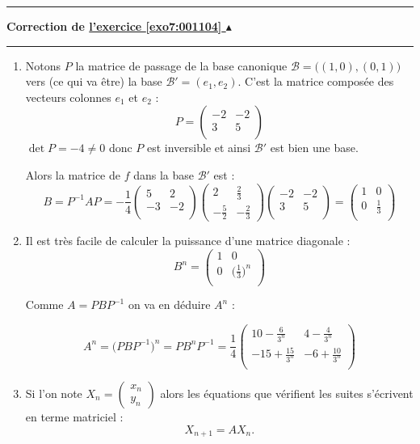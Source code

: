 \documentclass[11pt,a4paper]{article}
\newcounter{exo}
\newcommand{\correction}[1]{\hypertarget{cor7:#1}{}\label{cor7:#1}{\bf Correction de \hyperlink{exo7:#1}{l'exercice \ref{exo7:#1} $\blacktriangle$}}\vspace{1mm}\hrule\vspace{1mm}}
\newcommand{\fincorrection}{\vspace{1mm}\hrule\vspace*{7mm}}
\begin{document}
\fincorrection
\correction{001104}
\begin{enumerate}
  \item Notons $P$ la matrice de passage de la base canonique 
$\mathcal{B}=\big((1,0),(0,1)\big)$ vers (ce qui va être) la base
$\mathcal{B}' = (e_1, e_2)$. C'est la matrice composée des vecteurs colonnes
$e_1$ et $e_2$ :
$$P = \begin{pmatrix} -2 & -2 \\ 3 & 5 \\  \end{pmatrix}$$
$\det P=-4 \neq 0$ donc $P$ est inversible et ainsi $\mathcal{B}'$ est bien une base.

Alors la matrice de $f$ dans la base $\mathcal{B}'$ est :
$$B= P^{-1}AP = -\frac14\begin{pmatrix} 5 & 2 \\ -3 & -2 \\  \end{pmatrix} \begin{pmatrix} 2&\frac 23\\
-\frac 52&-\frac 23 \end{pmatrix}\begin{pmatrix} -2 & -2 \\ 3 & 5 \\  \end{pmatrix}=
\begin{pmatrix} 1 & 0 \\ 0 & \frac13 \\  \end{pmatrix}$$

  \item Il est très facile de calculer la puissance d'une matrice diagonale :
$$B^n=\begin{pmatrix} 1 & 0 \\ 0 & \big(\frac13\big)^n \\  \end{pmatrix}$$

Comme $A=PBP^{-1}$ on va en déduire $A^n$ : 

$$A^n = \big( PBP^{-1} \big)^n = P B^n P^{-1} = 
\frac14\begin{pmatrix} 
10- \frac{6} {3^n} & 4- \frac{4} {3^n}\\
-15 + \frac{15} {3^n}& -6 + \frac{10} {3^n}\\                    
       \end{pmatrix}$$

  \item Si l'on note $X_n = \begin{pmatrix}x_n \\ y_n \end{pmatrix}$
alors les équations que vérifient les suites s'écrivent en terme matriciel :
$$X_{n+1}=AX_n.$$


\end{enumerate}
\end{document}

